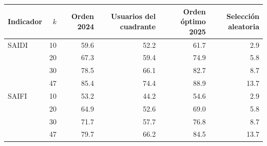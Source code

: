 \begin{tabular}{l r r r r r}
\toprule
\textbf{Indicador} & \textbf{$k$} & \textbf{Orden 2024} & \textbf{Usuarios del cuadrante} & \textbf{Orden óptimo 2025} & \textbf{Selección aleatoria} \\
\midrule
SAIDI & 10 & 59.6 & 52.2 & 61.7 & 2.9 \\
 & 20 & 67.3 & 59.4 & 74.9 & 5.8 \\
 & 30 & 78.5 & 66.1 & 82.7 & 8.7 \\
 & 47 & 85.4 & 74.4 & 88.9 & 13.7 \\
\addlinespace
SAIFI & 10 & 53.2 & 44.2 & 54.6 & 2.9 \\
 & 20 & 64.9 & 52.6 & 69.0 & 5.8 \\
 & 30 & 71.7 & 57.7 & 76.8 & 8.7 \\
 & 47 & 79.7 & 66.2 & 84.5 & 13.7 \\
\bottomrule
\end{tabular}
